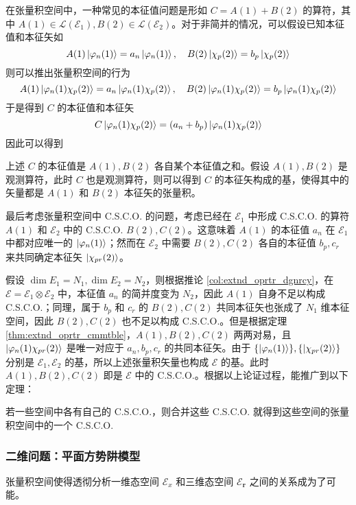 \documentclass[cn,10pt,math=newtx,citestyle=gb7714-2015,bibstyle=gb7714-2015]{elegantbook}
\def\bm{\boldsymbol}
\def\ms{\mathscr}
\def\mc{\mathcal}
\def\vphi{\varphi}
\def\ox{\otimes}
\begin{document}
在张量积空间中，一种常见的本征值问题是形如 $C = A(1)+B(2)$ 的算符，其中 $A(1)\in\mc L(\ms E_1),B(2)\in\mc L(\ms E_2)$。对于非简并的情况，可以假设已知本征值和本征矢如
\begin{equation}
    A(1)\ket{\vphi_n(1)} = a_n\ket{\vphi_n(1)},\quad B(2)\ket{\chi_p(2)} = b_p\ket{\chi_p(2)}
\end{equation}
则可以推出张量积空间的行为
\begin{equation}
    A(1)\ket{\vphi_n(1)\chi_p(2)} = a_n\ket{\vphi_n(1)\chi_p(2)},\quad B(2)\ket{\vphi_n(1)\chi_p(2)} = b_p\ket{\vphi_n(1)\chi_p(2)}
\end{equation}
于是得到 $C$ 的本征值和本征矢
\begin{equation}
    C\ket{\vphi_n(1)\chi_p(2)} = (a_n+b_p)\ket{\vphi_n(1)\chi_p(2)}
\end{equation}
因此可以得到
\begin{theorem}[不同空间延伸算符之和的本征系统]\label{thm:extnt_oprtr_sm_egnsystm}
   上述 $C$ 的本征值是 $A(1),B(2)$ 各自某个本征值之和。假设 $A(1),B(2)$ 是观测算符，此时 $C$ 也是观测算符，则可以得到 $C$ 的本征矢构成的基，使得其中的矢量都是 $A(1)$ 和 $B(2)$ 本征矢的张量积。
\end{theorem}

最后考虑张量积空间中 C.S.C.O. 的问题，考虑已经在 $\ms E_1$ 中形成 C.S.C.O. 的算符 $A(1)$ 和 $\ms E_2$ 中的 C.S.C.O. $B(2),C(2)$。这意味着 $A(1)$ 的本征值 $a_n$ 在 $\ms E_1$ 中都对应唯一的 $\ket{\vphi_n(1)}$；然而在 $\ms E_2$ 中需要 $B(2),C(2)$ 各自的本征值 $b_p,c_r$ 来共同确定本征矢 $\ket{\chi_{pr}(2)}$。

假设 $\dim E_1 = N_1, \dim E_2=N_2$，则根据推论 \ref{col:extnd_oprtr_dgnrcy}，在 $\ms E=\ms E_1\ox\ms E_2$ 中，本征值 $a_n$ 的简并度变为 $N_2$，因此 $A(1)$ 自身不足以构成 C.S.C.O.；同理，属于 $b_p$ 和 $c_r$ 的 $B(2),C(2)$ 共同本征矢也张成了 $N_1$ 维本征空间，因此 $B(2),C(2)$ 也不足以构成 C.S.C.O.。但是根据定理 \ref{thm:extnd_oprtr_cmmtble}，$A(1),B(2),C(2)$ 两两对易，且 $\ket{\vphi_n(1)\chi_{pr}(2)}$ 是唯一对应于 $a_n,b_p,c_r$ 的共同本征矢。由于 $\{\ket{\vphi_n(1)}\},\{\ket{\chi_{pr}(2)}\}$ 分别是 $\ms E_1,\ms E_2$ 的基，所以上述张量积矢量也构成 $\ms E$ 的基。此时 $A(1),B(2),C(2)$ 即是 $\ms E$ 中的 C.S.C.O.。根据以上论证过程，能推广到以下定理：
\begin{theorem}[张量积空间中的 C.S.C.O.]
   若一些空间中各有自己的 C.S.C.O.，则合并这些 C.S.C.O. 就得到这些空间的张量积空间中的一个 C.S.C.O.
\end{theorem}

\subsubsection{二维问题：平面方势阱模型}
张量积空间使得透彻分析一维态空间 $\ms E_x$ 和三维态空间 $\ms E_{\bm r}$ 之间的关系成为了可能。
\end{document}

